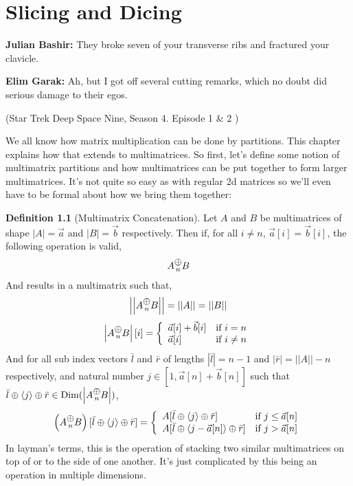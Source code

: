 \documentclass[12pt]{book}
\theoremstyle{plain}
\theoremstyle{definition}
\newtheorem{definition}{Definition}[chapter]
\theoremstyle{ppart}
\theoremstyle{case}
\theoremstyle{solution}
\DeclareMathOperator{\Dim}{Dim}
\newcommand{\mconcat}[1]{\text{\raisebox{1ex}{$\underset{#1}{\oplus}$}}}
\newcommand{\shape}[1]{\left|#1\right|}
\begin{document}
\chapter{Slicing and Dicing}

\begin{displayquote}
\textbf{Julian Bashir:} They broke seven of your transverse ribs and fractured your clavicle.

\textbf{Elim Garak:} Ah, but I got off several cutting remarks, which no doubt did serious damage to their egos.

(Star Trek Deep Space Nine, Season 4. Episode 1 \& 2 \cite{stds9})
\end{displayquote}

We all know how matrix multiplication can be done by partitions.
This chapter explains how that extends to multimatrices.
So first, let's define some notion of multimatrix partitions and how multimatrices can be put together to form
larger multimatrices. It's not quite so easy as with regular 2d matrices so we'll even have to be formal
about how we bring them together:

\begin{definition}[Multimatrix Concatenation]
Let $A$ and $B$ be multimatrices of shape $\shape{A} = \vec{a}$ and
$\shape{B} = \vec{b}$ respectively. Then if, for all $i \ne n$,
$\vec{a}[i] = \vec{b}[i]$, the following operation is valid,
\[ A \mconcat{n} B \]
And results in a multimatrix such that,
\[ \shape{\shape{A \mconcat{n} B}} = \shape{\shape{A}} = \shape{\shape{B}} \]
\[
  \shape{A \mconcat{n} B}[i] = \left\{
  \begin{array}{ll}
	  \vec{a}[i] + \vec{b}[i] & \mbox{if } i = n \\
	  \vec{a}[i] & \mbox{if } i \ne n
  \end{array}
 \right.
\]
And for all sub index vectors $\bar{l}$ and $\bar{r}$ of lengths $\shape{\bar{l}} = n-1$ and $\shape{\bar{r}} = \shape{\shape{A}}-n$ respectively,
and natural number $j \in [1,\vec{a}[n]+\vec{b}[n]]$ such that $\bar{l} \oplus \left<j\right> \oplus \bar{r} \in \Dim(\shape{A \mconcat{n} B})$,
\[
  \left(A \mconcat{n} B\right)[\bar{l} \oplus \left<j\right> \oplus \bar{r}] = \left\{
  \begin{array}{ll}
	  A[\bar{l} \oplus \left<j\right> \oplus \bar{r}] & \mbox{if } j  \le \vec{a}[n] \\
	  A[\bar{l} \oplus \left<j-\vec{a}[n]\right> \oplus \bar{r}] & \mbox{if } j > \vec{a}[n]
  \end{array}
 \right.
\]
In layman's terms, this is the operation of stacking two similar multimatrices on top of or to the side of one another.
It's just complicated by this being an operation in multiple dimensions.
\end{definition}
\end{document}
